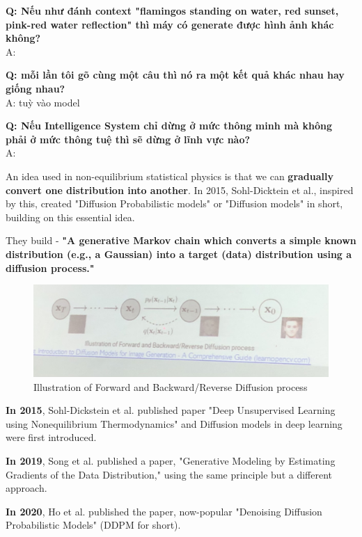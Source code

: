 \textbf{Q: Nếu như đánh context "flamingos standing on water, red sunset, pink-red water reflection" thì máy có generate được hình ảnh khác không?}\\
A: 


\textbf{Q: mỗi lần tôi gõ cùng một câu thì nó ra một kết quả khác nhau hay giống nhau?}\\
A: tuỳ vào model


\textbf{Q: Nếu Intelligence System chỉ dừng ở mức thông minh mà không phải ở mức thông tuệ thì sẽ dừng ở lĩnh vực nào?}\\
A: 

An idea used in non-equilibrium statistical physics is that we can \textbf{gradually convert one distribution into another}. In 2015, Sohl-Dicktein et al., inspired by this, created "Diffusion Probabilistic models" or "Diffusion models" in short, building on this essential idea.

They build - \textbf{"A generative Markov chain which converts a simple known distribution (e.g., a Gaussian) into a target (data) distribution using a diffusion process."}

\begin{figure}[H]
    \centering
    \includegraphics[scale=.2]{img/ForwardNBackwardORReverse Diffusion process.jpg}
    \caption{Illustration of Forward and Backward/Reverse Diffusion process}
    \label{fig:my_label_with_H}
\end{figure}



\textbf{In 2015}, Sohl-Dickstein et al. published paper "Deep Unsupervised Learning using Nonequilibrium Thermodynamics" and Diffusion models in deep learning were first introduced.

\textbf{In 2019}, Song et al. published a paper, "Generative Modeling by Estimating Gradients of the Data Distribution," using the same principle but a different approach.

\textbf{In 2020}, Ho et al. published the paper, now-popular "Denoising Diffusion Probabilistic Models" (DDPM for short).

